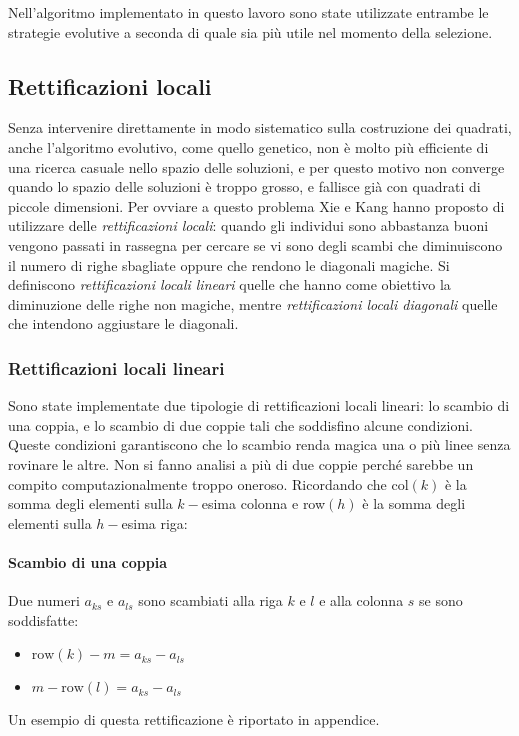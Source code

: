 \documentclass[italian,twoside,twocolumn]{article}
\begin{document}
Nell'algoritmo implementato in questo lavoro sono state utilizzate entrambe le strategie evolutive a seconda di quale sia più utile nel momento della selezione. 

\subsection{Rettificazioni locali}

Senza intervenire direttamente in modo sistematico sulla costruzione dei quadrati, anche l'algoritmo evolutivo, come quello genetico, non è molto più efficiente di una ricerca casuale nello spazio delle soluzioni, e per questo motivo non converge quando lo spazio delle soluzioni è troppo grosso, e fallisce già con quadrati di piccole dimensioni. Per ovviare a questo problema Xie e Kang hanno proposto di utilizzare delle \emph{rettificazioni locali}: quando gli individui sono abbastanza buoni vengono passati in rassegna per cercare se vi sono degli scambi che diminuiscono il numero di righe sbagliate oppure che rendono le diagonali magiche. Si definiscono \emph{rettificazioni locali lineari} quelle che hanno come obiettivo la diminuzione delle righe non magiche, mentre \emph{rettificazioni locali diagonali} quelle che intendono aggiustare le diagonali.

\subsubsection{Rettificazioni locali lineari}
Sono state implementate due tipologie di rettificazioni locali lineari: lo scambio di una coppia, e lo scambio di due coppie tali che soddisfino alcune condizioni. Queste condizioni garantiscono che lo scambio renda magica una o più linee senza rovinare le altre. Non si fanno analisi a più di due coppie perché sarebbe un compito computazionalmente troppo oneroso. Ricordando che col$ (k) $ è la somma degli elementi sulla $ k- $esima colonna e row$ (h) $ è la somma degli elementi sulla $ h- $esima riga:

\paragraph{Scambio di una coppia} Due numeri $ a_{ks} $ e $ a_{ls} $ sono scambiati alla riga $ k $ e $ l $ e alla colonna $ s $ se sono soddisfatte: 
\begin{itemize}
	\item $ \text{row}(k) - \mathit{m} = a_{ks} - a_{ls} $
	\item $ \mathit{m} - \text{row}(l) = a_{ks} - a_{ls} $
\end{itemize}
Un esempio di questa rettificazione è riportato in appendice. 
\end{document}
